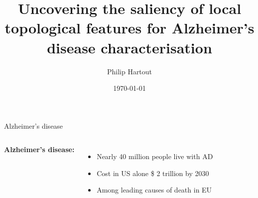 \documentclass[aspectratio=169, 10pt, dvipsnames]{beamer}
\title{Uncovering the saliency of local topological features for Alzheimer's disease characterisation}
\date{\today}
\author{Philip Hartout}
\begin{document}
\maketitle

\begin{frame}[fragile]{Alzheimer's disease}

  \begin{columns}[T,onlytextwidth]
    \textbf{Alzheimer's disease:}
    \begin{itemize}
    \pause\item Nearly 40 million people live with AD
    \pause\item Cost in US alone \$ 2 trillion by 2030
    \pause\item Among leading causes of death in EU
    \end{itemize}
\end{columns}
\end{frame}
\end{document}
